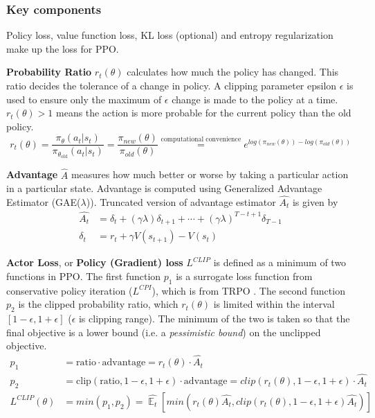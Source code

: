 \documentclass[lang=en,mode=normal,device=normal,color=blue,12pt]{elegantnote}
\DeclareMathOperator*{\E}{\mathbb{E}}
\DeclareMathOperator*{\1}{\mathbbm{1}}
\begin{document}
\subsubsection{Key components}

Policy loss, value function loss, KL loss (optional) and entropy regularization make up the loss for PPO.

\textbf{Probability Ratio} $r_t(\theta)$ calculates how much the policy has changed. This ratio decides the tolerance of a change in policy. A clipping parameter epsilon $\epsilon$ is used to ensure only the maximum of $\epsilon$ change is made to the policy at a time. $r_t(\theta) > 1$ means the action is more probable for the current policy than the old policy.
\[
r_t(\theta) = \frac{\pi_{\theta} (a_t | s_t)}{\pi_{\theta_\text{old}} (a_t | s_t)} = \frac{\pi_{new}(\theta)}{\pi_{old}(\theta)} \overset{\mathrm{\text{computational convenience}}}= e^{ log(\pi_{new}(\theta)) - log(\pi_{old}(\theta)) }
\]


\textbf{Advantage} $\hat{A}$ measures how much better or worse by taking a particular action in a particular state. Advantage is computed using Generalized Advantage Estimator (GAE($\lambda$)). Truncated version of advantage estimator $\hat{A_t}$ is given by
\begin{align*}
\hat{A_t} & = \delta_t + (\gamma \lambda)\delta_{t+1} + \cdots + (\gamma\lambda)^{T-t+1}\delta_{T-1} \\
\delta_t & = r_t + \gamma V(s_{t+1}) - V(s_t)
\end{align*}

\textbf{Actor Loss}, or \textbf{Policy (Gradient) loss} $L^{CLIP}$ is defined as a minimum of two functions in PPO. The first function $p_1$ is a surrogate loss function from conservative policy iteration ($L^{CPI}$), which is from TRPO \cite{schulman2017trust}.
The second function $p_2$ is the clipped probability ratio, which $r_t(\theta)$ is limited within the interval $[1-\epsilon, 1+\epsilon]$ ($\epsilon$ is clipping range).
The minimum of the two is taken so that the final objective is a lower bound (i.e. a \textit{pessimistic bound}) on the unclipped objective.
\begin{align*}
p_1 & = \text{ratio}\cdot\text{advantage} = r_t(\theta)\cdot\hat{A_t}\\
p_2 & = \text{clip}(\text{ratio}, 1-\epsilon, 1+\epsilon)\cdot\text{advantage} = clip(r_t(\theta), 1-\epsilon, 1+\epsilon)\cdot\hat{A_t}\\
L^{CLIP}(\theta) & = min(p_1, p_2) = \hat{\E_t}[min(r_t(\theta)\hat{A_t},clip(r_t(\theta),1-\epsilon,1+\epsilon)\hat{A_t})]
\end{align*}
\end{document}
